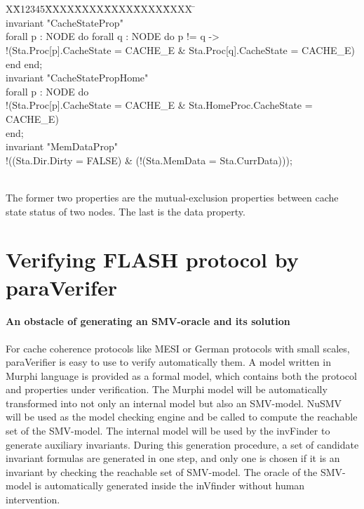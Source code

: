 \documentclass{llncs}
\newlength{\fminilength}
\newenvironment{fmini}[1][\linewidth]
  {\setlength{\fminilength}{#1\fboxsep-2\fboxrule}%
   \vspace{2ex}\noindent\begin{lrbox}{\fminibox}\begin{minipage}{\fminilength}%
   \mbox{ }\hfill\vspace{-2.5ex}}%
  {\end{minipage}\end{lrbox}\vspace{1ex}\hspace{0ex}%
   \framebox{\usebox{\fminibox}}}
\newenvironment{specification}
{\noindent\scriptsize
\tt\begin{fmini}\begin{tabbing}X\=X12345\=XXXX\=XXXX\=XXXX\=XXXX\=XXXX
\=\+\kill} {\end{tabbing}\normalfont\end{fmini}}
\newcommand{\bedt}[1]{{\color{blue}#1}}
\begin{document}
\begin{specification}\\
invariant "CacheStateProp"\\
  forall p : NODE do forall q : NODE do     p != q ->\\
    !(Sta.Proc[p].CacheState = CACHE\_E \& Sta.Proc[q].CacheState = CACHE\_E)\\
  end end;\\

invariant "CacheStatePropHome"\\
  forall p : NODE do\\
    !(Sta.Proc[p].CacheState = CACHE\_E \& Sta.HomeProc.CacheState = CACHE\_E)\\
  end;\\

invariant "MemDataProp"\\
  !((Sta.Dir.Dirty = FALSE) \& (!(Sta.MemData = Sta.CurrData)));\\
\end{specification}\\

The former two properties are the mutual-exclusion properties between  cache state status of two nodes. The last is the  data property.

\section{Verifying FLASH protocol by {\sf paraVerifer} \label{sec:experiments}}
\paragraph{An obstacle of generating an SMV-oracle and its solution}
For cache coherence protocols like MESI or German protocols with small scales,   {\sf paraVerifier}  is easy to use to verify automatically them. \bedt{A model written in Murphi language} is provided as a formal model, which contains both the protocol and properties under verification. The Murphi model will be automatically transformed into not only an internal model but also an SMV-model. NuSMV will \bedt{be used as the model checking engine} and be called to compute the reachable set of the SMV-model. The internal model will be used by the {\sf invFinder} to generate auxiliary invariants. During this generation procedure, a set of candidate invariant formulas are generated in one step, and only one is chosen  if it is an invariant by checking the reachable set of   SMV-model. The oracle of the SMV-model is automatically generated inside the {\sf inVfinder} without human intervention.
\end{document}
